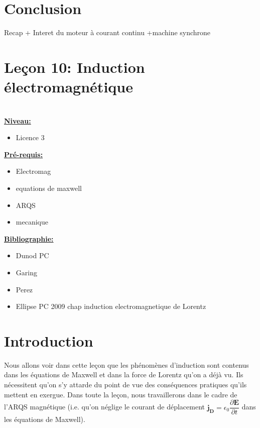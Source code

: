 \documentclass[french, a4paper, 10pt, twocolumn, landscape]{article}
\begin{document}



\section*{Conclusion}

Recap + Interet du moteur à courant continu +machine synchrone

\clearpage

\section*{Leçon 10: Induction électromagnétique}

\hrulefill\\

\noindent\underline{\textbf{Niveau:}}
\begin{itemize}
  \item Licence 3 
\end{itemize}
\underline{\textbf{Pr{\'e}-requis: }}

\begin{itemize}  
\item Electromag 
\item equations de maxwell
\item ARQS
\item mecanique
\end{itemize}
\underline{\textbf{Bibliographie:}}

\begin{itemize}
  \item Dunod PC
  \item Garing
  \item Perez
  \item Ellipse PC 2009 chap induction electromagnetique de Lorentz
\end{itemize}
\hrulefill

\section* {Introduction}

Nous allons voir dans cette leçon que les phénomènes d'induction sont contenus dans les équations de Maxwell et dans la force de Lorentz qu'on a déjà vu. Ils nécessitent qu'on s'y attarde du point de vue des conséquences pratiques qu'ils mettent en exergue. Dans toute la leçon, nous travaillerons dans le cadre de l'ARQS magnétique (i.e. qu'on néglige le courant de déplacement $\mathbf{j_D}=\epsilon_0\dfrac{\partial \mathbf{E}}{\partial t}$ dans les équations de Maxwell).\\
  
\end{document}
